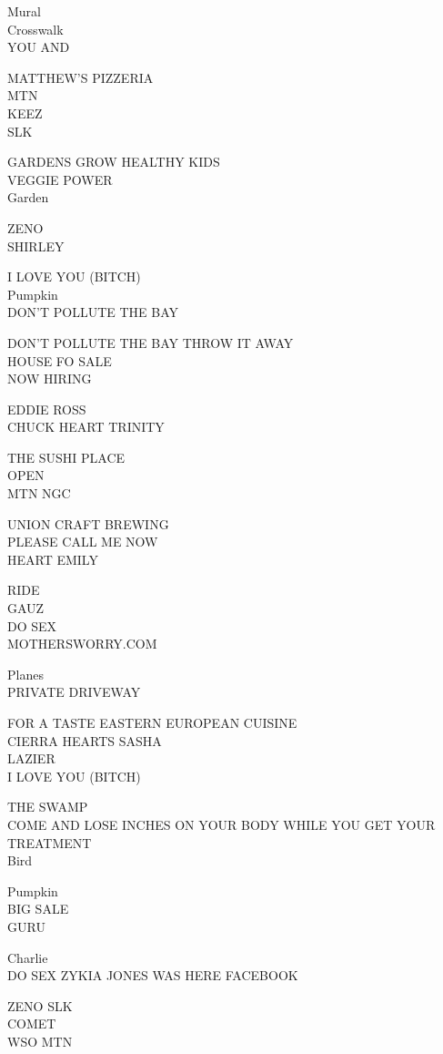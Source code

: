 \documentclass[10pt,letterpaper]{article}
\begin{document}
Mural\\
Crosswalk\\
YOU AND

MATTHEW'S PIZZERIA\\
MTN\\
KEEZ\\
SLK

GARDENS GROW HEALTHY KIDS\\
VEGGIE POWER\\
Garden

ZENO\\
SHIRLEY

I LOVE YOU (BITCH)\\
Pumpkin\\
DON'T POLLUTE THE BAY

DON'T POLLUTE THE BAY THROW IT AWAY\\
HOUSE FO SALE\\
NOW HIRING

EDDIE ROSS\\
CHUCK HEART TRINITY

THE SUSHI PLACE\\
OPEN\\
MTN NGC

UNION CRAFT BREWING\\
PLEASE CALL ME NOW\\
HEART EMILY

RIDE\\
GAUZ\\
DO SEX\\
MOTHERSWORRY.COM

Planes\\
PRIVATE DRIVEWAY

FOR A TASTE EASTERN EUROPEAN CUISINE\\
CIERRA HEARTS SASHA\\
LAZIER\\
I LOVE YOU (BITCH)

THE SWAMP\\
COME AND LOSE INCHES ON YOUR BODY WHILE YOU GET YOUR TREATMENT\\
Bird

Pumpkin\\
BIG SALE\\
GURU

Charlie\\
DO SEX ZYKIA JONES WAS HERE FACEBOOK

ZENO SLK\\
COMET\\
WSO MTN
\end{document}

